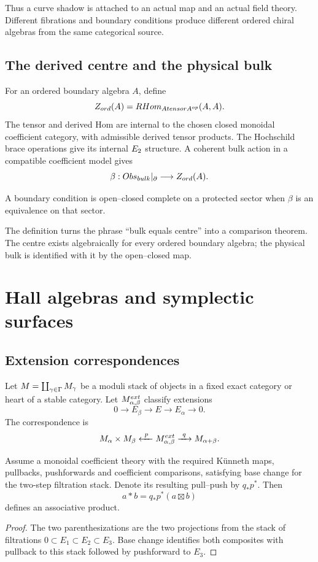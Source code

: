 Thus a curve shadow is attached to an actual map and an actual field theory. Different fibrations and boundary conditions produce different ordered chiral algebras from the same categorical source.

\section{The derived centre and the physical bulk}
For an ordered boundary algebra $A$, define
\[
 Z_{ord}(A)=RHom_{Atensor A^{op}}(A,A).
\]
The tensor and derived Hom are internal to the chosen closed monoidal
coefficient category, with admissible derived tensor products. The
Hochschild brace operations give its internal $E_2$ structure.
A coherent bulk action in a compatible coefficient model gives
\[
 \beta:Obs_{bulk}|_{\partial}\longrightarrow Z_{ord}(A).
\]

\begin{definition}
A boundary condition is open--closed complete on a protected sector when $\beta$ is an equivalence on that sector.
\end{definition}

The definition turns the phrase ``bulk equals centre'' into a comparison theorem. The centre exists algebraically for every ordered boundary algebra; the physical bulk is identified with it by the open--closed map.

\chapter{Hall algebras and symplectic surfaces}

\section{Extension correspondences}
Let $M=\coprod_{\gamma\in\Gamma}M_\gamma$ be a moduli stack of objects in a fixed exact category or heart of a stable category. Let $M^{ext}_{\alpha,\beta}$ classify extensions
\[
 0\longrightarrow E_\beta\longrightarrow E\longrightarrow E_\alpha\longrightarrow0.
\]
The correspondence is
\[
 M_\alpha\times M_\beta
 \xleftarrow{\ p\ }
 M^{ext}_{\alpha,\beta}
 \xrightarrow{\ q\ }
 M_{\alpha+\beta}.
\]

\begin{theorem}
Assume a monoidal coefficient theory with the required K\"unneth maps, pullbacks, pushforwards and coefficient comparisons, satisfying base change for the two-step filtration stack. Denote its resulting pull--push by $q_*p^*$. Then
\[
 a*b=q_*p^*(a\boxtimes b)
\]
defines an associative product.
\end{theorem}
\begin{proof}
The two parenthesizations are the two projections from the stack of filtrations $0\subset E_1\subset E_2\subset E_3$. Base change identifies both composites with pullback to this stack followed by pushforward to $E_3$.
\end{proof}

